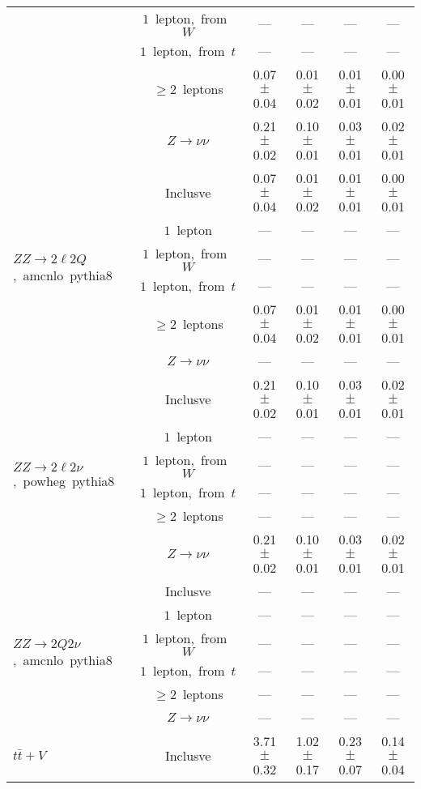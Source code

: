 \documentclass{article}
\begin{document}
\begin{longtable}{|l|c|c|c|c|c|}
 & $1$~lepton,~from~$W$  & ---  & ---  & ---  & --- \\* 
 & $1$~lepton,~from~$t$  & ---  & ---  & ---  & --- \\* 
 & $\ge2$~leptons  & 0.07 $\pm$ 0.04  & 0.01 $\pm$ 0.02  & 0.01 $\pm$ 0.01  & 0.00 $\pm$ 0.01 \\* 
 & $Z\rightarrow\nu\nu$  & 0.21 $\pm$ 0.02  & 0.10 $\pm$ 0.01  & 0.03 $\pm$ 0.01  & 0.02 $\pm$ 0.01 \\* 
\hline 
\multirow{6}{*}{$ZZ{\rightarrow}2{\ell}2Q$,~amcnlo~pythia8} & Inclusve  & 0.07 $\pm$ 0.04  & 0.01 $\pm$ 0.02  & 0.01 $\pm$ 0.01  & 0.00 $\pm$ 0.01 \\* 
 & $1$~lepton  & ---  & ---  & ---  & --- \\* 
 & $1$~lepton,~from~$W$  & ---  & ---  & ---  & --- \\* 
 & $1$~lepton,~from~$t$  & ---  & ---  & ---  & --- \\* 
 & $\ge2$~leptons  & 0.07 $\pm$ 0.04  & 0.01 $\pm$ 0.02  & 0.01 $\pm$ 0.01  & 0.00 $\pm$ 0.01 \\* 
 & $Z\rightarrow\nu\nu$  & ---  & ---  & ---  & --- \\* 
\hline 
\multirow{6}{*}{$ZZ{\rightarrow}2{\ell}2{\nu}$,~powheg~pythia8} & Inclusve  & 0.21 $\pm$ 0.02  & 0.10 $\pm$ 0.01  & 0.03 $\pm$ 0.01  & 0.02 $\pm$ 0.01 \\* 
 & $1$~lepton  & ---  & ---  & ---  & --- \\* 
 & $1$~lepton,~from~$W$  & ---  & ---  & ---  & --- \\* 
 & $1$~lepton,~from~$t$  & ---  & ---  & ---  & --- \\* 
 & $\ge2$~leptons  & ---  & ---  & ---  & --- \\* 
 & $Z\rightarrow\nu\nu$  & 0.21 $\pm$ 0.02  & 0.10 $\pm$ 0.01  & 0.03 $\pm$ 0.01  & 0.02 $\pm$ 0.01 \\* 
\hline 
\multirow{6}{*}{$ZZ{\rightarrow}2Q2{\nu}$,~amcnlo~pythia8} & Inclusve  & ---  & ---  & ---  & --- \\* 
 & $1$~lepton  & ---  & ---  & ---  & --- \\* 
 & $1$~lepton,~from~$W$  & ---  & ---  & ---  & --- \\* 
 & $1$~lepton,~from~$t$  & ---  & ---  & ---  & --- \\* 
 & $\ge2$~leptons  & ---  & ---  & ---  & --- \\* 
 & $Z\rightarrow\nu\nu$  & ---  & ---  & ---  & --- \\* 
\hline 
\multirow{6}{*}{$t\bar{t}+V$} & Inclusve  & 3.71 $\pm$ 0.32  & 1.02 $\pm$ 0.17  & 0.23 $\pm$ 0.07  & 0.14 $\pm$ 0.04 \\* 

\end{longtable}
\end{document}
